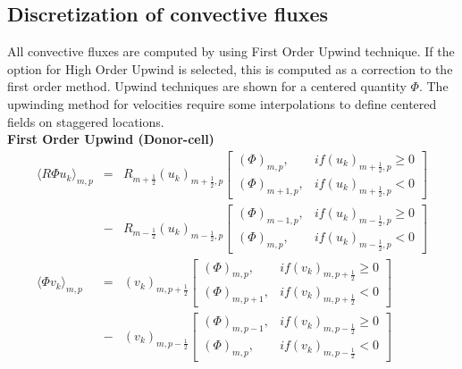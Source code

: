 \subsection{Discretization of convective fluxes}
All convective fluxes are computed by using First Order Upwind technique.
If the option for High Order Upwind is selected, this is computed as
a correction to the first order method. Upwind techniques are shown for
a centered quantity $\Phi$. The upwinding method for velocities
require some interpolations to define centered fields on staggered locations.\\

{\bf First Order Upwind (Donor-cell)}
%
\begin{eqnarray}
%
\langle R \Phi u_k \rangle_{m,p} & = & R_{m+\frac{1}{2}} (u_k)_{m+\frac{1}{2},p} 
\left[ \begin{array}{cc}
\displaystyle{(\Phi)_{m,p}}, & \displaystyle if (u_k)_{m+\frac{1}{2},p}  \ge 0 \\
\displaystyle{(\Phi)_{m+1,p}}, & \displaystyle if (u_k)_{m+\frac{1}{2},p} < 0
\end{array} \right] \\ \nonumber
%
                                 & - & R_{m-\frac{1}{2}} (u_k)_{m-\frac{1}{2},p}
\left[ \begin{array}{cc}
\displaystyle{(\Phi)_{m-1,p}}, & \displaystyle if (u_k)_{m-\frac{1}{2},p}  \ge 0 \\
\displaystyle{(\Phi)_{m,p}}, & \displaystyle if (u_k)_{m-\frac{1}{2},p} < 0
\end{array} \right] \\ \nonumber
%
\langle \Phi v_k \rangle_{m,p} & = & (v_k)_{m,p+\frac{1}{2}}
\left[ \begin{array}{cc}
\displaystyle{(\Phi)_{m,p}}, & \displaystyle if (v_k)_{m,p+\frac{1}{2}}  \ge 0 \\
\displaystyle{(\Phi)_{m,p+1}}, & \displaystyle if (v_k)_{m,p+\frac{1}{2}} < 0
\end{array} \right] \\ \nonumber
%
                               & - & (v_k)_{m,p-\frac{1}{2}}
\left[ \begin{array}{cc}
\displaystyle{(\Phi)_{m,p-1}}, & \displaystyle if (v_k)_{m,p-\frac{1}{2}}  \ge 0 \\
\displaystyle{(\Phi)_{m,p}}, & \displaystyle if (v_k)_{m,p-\frac{1}{2}} < 0
\end{array} \right] \nonumber
%
\end{eqnarray}

